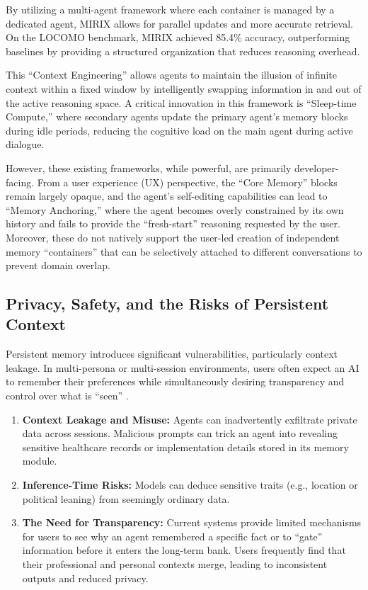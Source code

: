 \documentclass[12pt,a4paper]{article}
\begin{document}
By utilizing a multi-agent framework where each container is managed by a dedicated agent, MIRIX allows for parallel updates and more accurate retrieval. On the LOCOMO benchmark, MIRIX achieved 85.4\% accuracy, outperforming baselines by providing a structured organization that reduces reasoning overhead.

This ``Context Engineering'' allows agents to maintain the illusion of infinite context within a fixed window by intelligently swapping information in and out of the active reasoning space. A critical innovation in this framework is ``Sleep-time Compute,'' where secondary agents update the primary agent's memory blocks during idle periods, reducing the cognitive load on the main agent during active dialogue.

However, these existing frameworks, while powerful, are primarily developer-facing. From a user experience (UX) perspective, the ``Core Memory'' blocks remain largely opaque, and the agent's self-editing capabilities can lead to ``Memory Anchoring,'' where the agent becomes overly constrained by its own history and fails to provide the ``fresh-start'' reasoning requested by the user. Moreover, these do not natively support the user-led creation of independent memory ``containers'' that can be selectively attached to different conversations to prevent domain overlap.

\subsection{Privacy, Safety, and the Risks of Persistent Context}

Persistent memory introduces significant vulnerabilities, particularly context leakage. In multi-persona or multi-session environments, users often expect an AI to remember their preferences while simultaneously desiring transparency and control over what is ``seen'' \cite{ali2025understanding}.

\begin{enumerate}
    \item \textbf{Context Leakage and Misuse:} Agents can inadvertently exfiltrate private data across sessions. Malicious prompts can trick an agent into revealing sensitive healthcare records or implementation details stored in its memory module.
    
    \item \textbf{Inference-Time Risks:} Models can deduce sensitive traits (e.g., location or political leaning) from seemingly ordinary data.
    
    \item \textbf{The Need for Transparency:} Current systems provide limited mechanisms for users to see why an agent remembered a specific fact or to ``gate'' information before it enters the long-term bank. Users frequently find that their professional and personal contexts merge, leading to inconsistent outputs and reduced privacy.
\end{enumerate}
\end{document}
